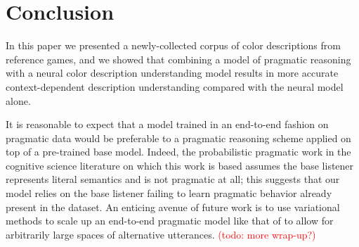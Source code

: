 \documentclass[11pt,letterpaper]{article}
\renewcommand{\|}{\mid}
\newcommand{\todocheck}[1]{\textcolor{red}{#1}}
\begin{document}
\section{Conclusion}

In this paper we presented a newly-collected corpus of color descriptions from
reference games, and we showed that combining a model of pragmatic reasoning
with a neural color description understanding model results in more accurate
context-dependent description understanding compared with the neural model alone.

It is reasonable to expect that a model trained in an end-to-end fashion on
pragmatic data would be preferable to a pragmatic reasoning scheme applied on
top of a pre-trained base model.
Indeed, the probabilistic pragmatic work in the cognitive science literature
on which this work is based assumes the base listener represents literal semantics
and is not pragmatic at all; this suggests that our model relies on the base
listener failing to learn pragmatic behavior already present in the dataset.
An enticing avenue of future work is to use variational methods to scale
up an end-to-end pragmatic model like that of  to
allow for arbitrarily large spaces of alternative utterances.
\todocheck{(todo: more wrap-up?)}
\end{document}
